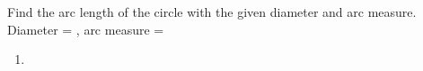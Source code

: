 Find the arc length of the circle with the given diameter and arc measure.
\newline
Diameter = , arc measure = \degree
\newline
\begin{enumerate}
    \item
    \degree
{}
\end{enumerate}

